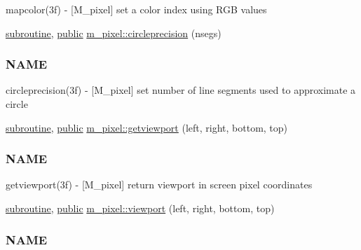 \begin{DoxyCompactItemize}
\begin{DoxyCompactList}
mapcolor(3f) -\/ \mbox{[}M\+\_\+pixel\mbox{]} set a color index using R\+GB values \end{DoxyCompactList}\item 
\hyperlink{M__stopwatch_83_8txt_acfbcff50169d691ff02d4a123ed70482}{subroutine}, \hyperlink{M__stopwatch_83_8txt_a2f74811300c361e53b430611a7d1769f}{public} \hyperlink{namespacem__pixel_a68ca1be8f7a92ece6efce8d69987af9c}{m\+\_\+pixel\+::circleprecision} (nsegs)
\begin{DoxyCompactList}\small\item\em \subsubsection*{N\+A\+ME}

circleprecision(3f) -\/ \mbox{[}M\+\_\+pixel\mbox{]} set number of line segments used to approximate a circle \end{DoxyCompactList}\item 
\hyperlink{M__stopwatch_83_8txt_acfbcff50169d691ff02d4a123ed70482}{subroutine}, \hyperlink{M__stopwatch_83_8txt_a2f74811300c361e53b430611a7d1769f}{public} \hyperlink{namespacem__pixel_a9f382cf8d3b69e11d1fdd2f2a4f59dea}{m\+\_\+pixel\+::getviewport} (left, right, bottom, top)
\begin{DoxyCompactList}\small\item\em \subsubsection*{N\+A\+ME}

getviewport(3f) -\/ \mbox{[}M\+\_\+pixel\mbox{]} return viewport in screen pixel coordinates \end{DoxyCompactList}\item 
\hyperlink{M__stopwatch_83_8txt_acfbcff50169d691ff02d4a123ed70482}{subroutine}, \hyperlink{M__stopwatch_83_8txt_a2f74811300c361e53b430611a7d1769f}{public} \hyperlink{namespacem__pixel_a43247343cd316e3aa075b44b5166e2e9}{m\+\_\+pixel\+::viewport} (left, right, bottom, top)
\begin{DoxyCompactList}\small\item\em \subsubsection*{N\+A\+ME}


\end{DoxyCompactList}
\end{DoxyCompactItemize}
